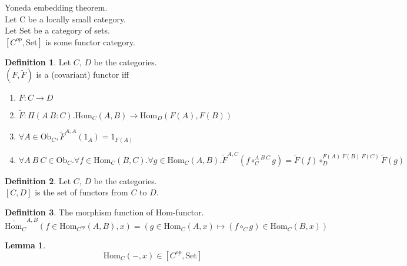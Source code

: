 \documentclass[10pt,a4paper]{article}
\theoremstyle{definition}
\newtheorem{definition}{Definition}[section]
\newtheorem{lemma}{Lemma}[section]
\newcommand{\Ob}{{\mbox{Ob}}}
\newcommand{\Hom}{{\mbox{Hom}}}
\newcommand{\Set}{{\mbox{Set}}}
\newcommand{\ra}{{\rightarrow}}
\begin{document}
Yoneda embedding theorem.\\
Let C be a locally small category.\\
Let Set be a category of sets.\\
$[C^{op},\mbox{Set}]$ is some functor category.\\

\begin{definition}
Let $C$, $D$ be the categories.\\
 $(F, \widetilde{F})$ is a (covariant) functor iff\\
\begin{enumerate}
\item $F:C \ra D$
\item $\widetilde{F}:\Pi(A\ B:C).\Hom_C(A,B) \ra \Hom_D(F(A), F(B))$
\item $\forall A\in \Ob_C, \widetilde{F}^{A,A}(1_A)=1_{F(A)}$
\item $\forall A\ B\ C \in \Ob_C.\forall f\in\Hom_C(B,C).\forall g\in\Hom_C(A,B). \widetilde{F}^{A,C}(f\circ_C^{A\ B\ C} g)=\widetilde{F}(f)\circ_D^{F(A)\ F(B)\ F(C)} \widetilde{F}(g)$
\end{enumerate}

\end{definition}

\begin{definition}
Let $C$, $D$ be the categories.\\
$[C,D]$ is the set of functors from $C$ to $D$.\\
\end{definition}

\begin{definition} The morphism function of Hom-functor.
$$\widetilde{\Hom_C}^{A,B}(f\in\Hom_{C^{op}}(A,B), x) = (g \in\Hom_C(A,x) \mapsto (f \circ_C g) \in\Hom_C(B,x))$$
\end{definition}

\begin{lemma}
$$\Hom_C(-, x) \in [C^{op},\Set]$$
\end{lemma}
\end{document}
